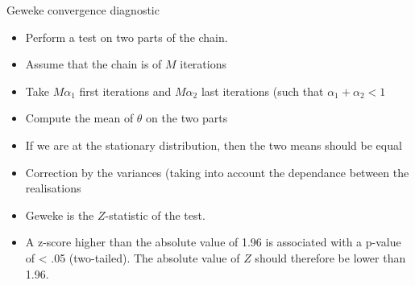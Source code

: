 \begin{frame}{Geweke convergence diagnostic}
\begin{itemize}
 \item  Perform a test on two parts of the chain. 
 \item Assume that the chain is of $M$ iterations
 \item Take $M\alpha_1$  first iterations and $M \alpha_2$ last iterations (such that $\alpha_1 + \alpha_2 <1$  
\item Compute the mean of $\theta$ on the two parts
 \item If we are at the stationary distribution, then the two means should be equal
 \item Correction by the variances (taking into account the dependance between the realisations
 \item Geweke is the $Z$-statistic of the test.
 \item A z-score higher than the absolute value of 1.96 is associated with a p-value of < .05 (two-tailed). The absolute value of $Z$ should therefore be lower than  1.96.
 \end{itemize}
\end{frame}
